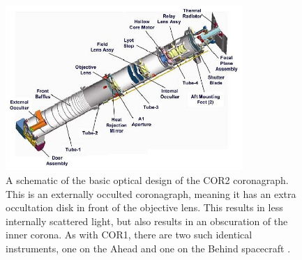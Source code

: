 \begin{figure}[!t]
\begin{center}
\includegraphics[width=0.8\textwidth, trim=0cm 0cm 0cm 1cm]{images/cor2}
\caption[The COR2 coronagraph]{A schematic of the basic optical design of the COR2 coronagraph. This is an externally occulted coronagraph, meaning it has an extra occultation disk in front of the objective lens. This results in less internally scattered light, but also results in an obscuration of the inner corona. As with COR1, there are two such identical instruments, one on the Ahead and one on the Behind spacecraft \citep{how08}.}
\label{fig:cor2}
\end{center}
\end{figure}


